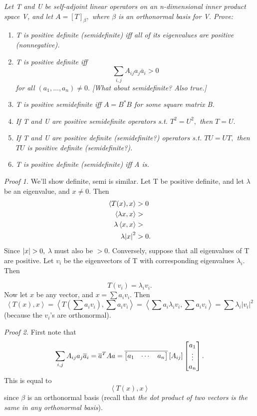 \documentclass[12pt,english]{article}
\begin{document}
\emph{Let T and U be self-adjoint linear operators on an n-dimensional
inner product space V, and let $A=\left[T\right]_{\beta},$ where
$\beta$ is an orthonormal basis for V. Prove:}
\begin{enumerate}
\item \emph{T is positive definite (semidefinite) iff all of its eigenvalues
are positive (nonnegative).}
\item \emph{T is positive definite iff
\[
\sum_{i,j}A_{ij}a_{j}\overline{a}_{i}>0
\]
for all $(a_{1},\ldots,a_{n})\neq0.$ {[}What about semidefinite?
Also true.{]}}
\item \emph{T is positive semidefinite iff $A=B^{*}B$ for some square matrix
B.}
\item \emph{If T and U are positive semidefinite operators s.t. $T^{2}=U^{2},$
then $T=U.$}
\item \emph{If T and U are positive definite (semidefinite?) operators s.t.
$TU=UT,$ then $TU$ is positive definite (semidefinite?).}
\item \emph{T is positive definite (semidefinite) iff A is.}
\end{enumerate}
\emph{Proof 1. }We'll show definite, semi is similar. Let T be positive
definite, and let $\lambda$ be an eigenvalue, and $x\neq0.$ Then
\begin{align*}
\left\langle T(x),x\right\rangle  & >0\\
\left\langle \lambda x,x\right\rangle  & >\\
\lambda\left\langle x,x\right\rangle  & >\\
\lambda\text{\ensuremath{\left|x\right|}}^{2} & >0.
\end{align*}
Since $\text{\ensuremath{\left|x\right|}}>0,$ $\lambda$ must also
be $>0.$ Conversely, suppose that all eigenvalues of T are positive.
Let $v_{i}$ be the eigenvectors of T with corresponding eigenvalues
$\lambda_{i}$. Then

\[
T(v_{i})=\lambda_{i}v_{i}.
\]
Now let $x$ be any vector, and $x=\sum a_{i}v_{i}.$ Then
\[
\left\langle T(x),x\right\rangle =\left\langle T\left(\sum a_{i}v_{i}\right),\sum a_{i}v_{i}\right\rangle =\left\langle \sum a_{i}\lambda_{i}v_{i},\sum a_{i}v_{i}\right\rangle =\sum\lambda_{i}\left|v_{i}\right|^{2}
\]
(because the $v_{i}$'s are orthonormal).

\emph{Proof 2. }First note that
\[
\sum_{i,j}A_{ij}a_{j}\overline{a}_{i}=\text{\ensuremath{\overline{a}^{T}Aa=\overline{\begin{bmatrix}a_{1} & \cdots & a_{n}\end{bmatrix}}\left[A_{ij}\right]\begin{bmatrix}a_{1}\\
\vdots\\
a_{n}
\end{bmatrix}.}}
\]
This is equal to
\[
\left\langle T\left(x\right),x\right\rangle
\]
since $\beta$ is an orthonormal basis (recall that \emph{the dot
product of two vectors is the same in any orthonormal basis}).
\end{document}
